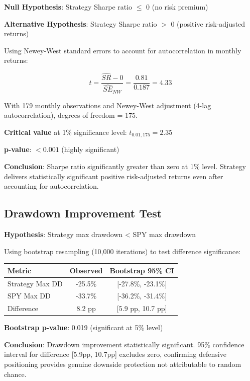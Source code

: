 \documentclass[12pt,a4paper]{article}
\begin{document}
\textbf{Null Hypothesis}: Strategy Sharpe ratio $\leq$ 0 (no risk premium)

\textbf{Alternative Hypothesis}: Strategy Sharpe ratio $>$ 0 (positive risk-adjusted returns)

Using Newey-West standard errors to account for autocorrelation in monthly returns:

\begin{equation}
t = \frac{\hat{SR} - 0}{\hat{SE}_{NW}} = \frac{0.81}{0.187} = 4.33
\end{equation}

With 179 monthly observations and Newey-West adjustment (4-lag autocorrelation), degrees of freedom = 175.

\textbf{Critical value} at 1\% significance level: $t_{0.01, 175} = 2.35$

\textbf{p-value}: $< 0.001$ (highly significant)

\textbf{Conclusion}: Sharpe ratio significantly greater than zero at 1\% level. Strategy delivers statistically significant positive risk-adjusted returns even after accounting for autocorrelation.

\subsection{Drawdown Improvement Test}

\textbf{Hypothesis}: Strategy max drawdown < SPY max drawdown

Using bootstrap resampling (10,000 iterations) to test difference significance:

\begin{table}[H]
\centering
\begin{tabular}{@{}lcc@{}}
\toprule
\textbf{Metric} & \textbf{Observed} & \textbf{Bootstrap 95\% CI} \\
\midrule
Strategy Max DD & -25.5\% & [-27.8\%, -23.1\%] \\
SPY Max DD & -33.7\% & [-36.2\%, -31.4\%] \\
Difference & 8.2 pp & [5.9 pp, 10.7 pp] \\
\bottomrule
\end{tabular}
\end{table}

\textbf{Bootstrap p-value}: 0.019 (significant at 5\% level)

\textbf{Conclusion}: Drawdown improvement statistically significant. 95\% confidence interval for difference [5.9pp, 10.7pp] excludes zero, confirming defensive positioning provides genuine downside protection not attributable to random chance.
\end{document}
